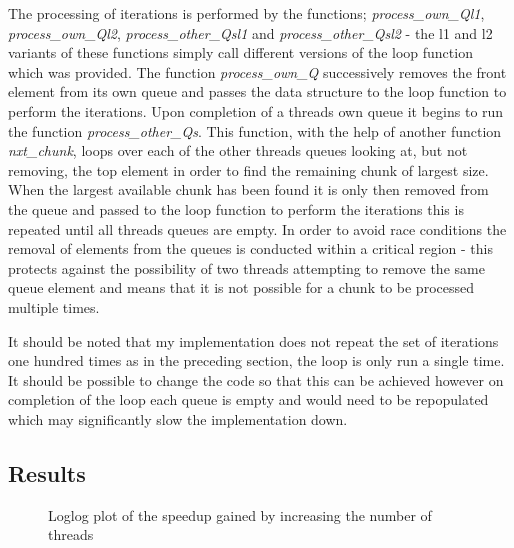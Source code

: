 \documentclass[12pt]{article} %
\begin{document}
The processing of iterations is performed by the functions; \textit{process\_own\_Ql1}, \textit{process\_own\_Ql2}, \textit{process\_other\_Qsl1} and \textit{process\_other\_Qsl2} - the l1 and l2 variants of these functions simply call different versions of the loop function which was provided. The function \textit{process\_own\_Q} successively removes the front element from its own queue and passes the data structure to the loop function to perform the iterations. Upon completion of a threads own queue it begins to run the function \textit{process\_other\_Qs}. This function, with the help of another function \textit{nxt\_chunk}, loops over each of the other threads queues looking at, but not removing, the top element in order to find the remaining chunk of largest size. When the largest available chunk has been found it is only then removed from the queue and passed to the loop function to perform the iterations this is repeated until all threads queues are empty. In order to avoid race conditions the removal of elements from the queues is conducted within a critical region - this protects against the possibility of two threads attempting to remove the same queue element and means that it is not possible for a chunk to be processed multiple times.  

It should be noted that my implementation does not repeat the set of iterations one hundred times as in the preceding section, the loop is only run a single time. It should be possible to change the code so that this can be achieved however on completion of the loop each queue is empty and would need to be repopulated which may significantly slow the implementation down.   

\subsection{Results}
\begin{figure}[H] %
\caption{Loglog plot of the speedup gained by increasing the number of threads}
\label{fig:speciation}
\end{figure}
\end{document}
